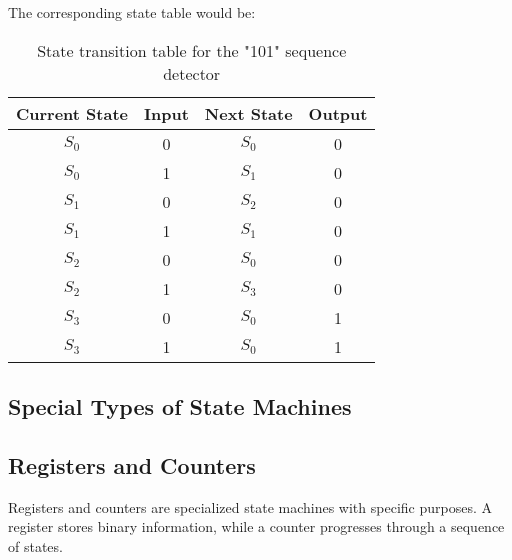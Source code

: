 The corresponding state table would be:

\begin{table}[h]
    \centering
    \begin{tabular}{|c|c|c|c|}
        \hline
        \textbf{Current State} & \textbf{Input} & \textbf{Next State} & \textbf{Output} \\
        \hline
        $S_0$                  & 0              & $S_0$               & 0               \\
        $S_0$                  & 1              & $S_1$               & 0               \\
        $S_1$                  & 0              & $S_2$               & 0               \\
        $S_1$                  & 1              & $S_1$               & 0               \\
        $S_2$                  & 0              & $S_0$               & 0               \\
        $S_2$                  & 1              & $S_3$               & 0               \\
        $S_3$                  & 0              & $S_0$               & 1               \\
        $S_3$                  & 1              & $S_0$               & 1               \\
        \hline
    \end{tabular}
    \caption{State transition table for the "101" sequence detector}
    \label{tab:sequence_detector}
\end{table}

\subsection{Special Types of State Machines}

\subsection*{Registers and Counters}

Registers and counters are specialized state machines with specific purposes. A register stores binary information, while a counter progresses through a sequence of states.

